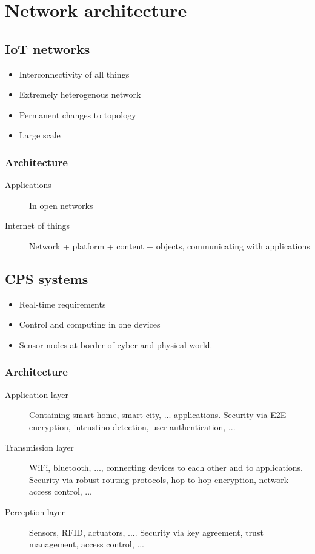 \section{Network architecture}

\subsection{IoT networks}

\begin{itemize}
		\item Interconnectivity of all things
		\item Extremely heterogenous network
		\item Permanent changes to topology
		\item Large scale
\end{itemize}

\subsubsection{Architecture}

\begin{description}
		\item[Applications] In open networks
		\item[Internet of things] Network + platform + content + objects,
				communicating with applications
\end{description}

\subsection{CPS systems}

\begin{itemize}
		\item Real-time requirements
		\item Control and computing in one devices
		\item Sensor nodes at border of cyber and physical world.
\end{itemize}

\subsubsection{Architecture}

\begin{description}
		\item[Application layer] Containing smart home, smart city, ...
				applications. Security via E2E encryption, intrustino
				detection, user authentication, ...
		\item[Transmission layer] WiFi, bluetooth, ..., connecting devices to
				each other and to applications. Security via robust routnig
				protocols, hop-to-hop encryption, network access control, ...
		\item[Perception layer] Sensors, RFID, actuators, .... Security via key
				agreement, trust management, access control, ...
\end{description}

